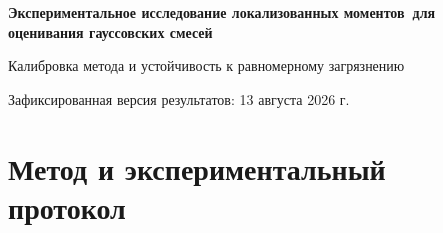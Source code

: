 \documentclass[11pt,a4paper]{article}
\begin{document}
\begin{center}
  {\sffamily\bfseries\LARGE
    Экспериментальное исследование локализованных моментов\
    для оценивания гауссовских смесей\par}
  \vspace{0.6em}
  {\large Калибровка метода и устойчивость к равномерному загрязнению\par}
  \vspace{0.4em}
  {\small Зафиксированная версия результатов: 13 августа 2026 г.}
\end{center}

\begin{abstract}
Мы исследуем оценивание сферических гауссовских смесей по локализованным
нулевым, первым и вторым моментам. Предварительные эксперименты показывают,
что на корректно специфицированных данных преимущество над EM ограничено
смесями с почти одинаковыми дисперсиями. Напротив, при замене
$2$--$10\%$ наблюдений равномерным фоновым шумом критерий только на вторых
моментах устойчиво превосходит EM по восстановлению незагрязнённой смеси и
кластеризации. В подтверждающем эксперименте с одинаковым набором тестовых
функций и новыми seed при $5\%$ загрязнения средний forward KL уменьшается с
$0.277$ до $0.145$, а ARI возрастает с $0.384$ до $0.534$. Контроли показывают,
что эффект не объясняется большим числом направлений, случайностью запуска
или размещением тестов в областях малой плотности. Добавление нулевых и первых
моментов при достаточно сильном загрязнении ухудшает результат; следовательно,
это не безусловно полезные дополнительные ограничения, а чувствительные к
misspecification компоненты критерия. Отдельно выводится leave-one-out
поправка, устраняющая смещение, возникающее, когда центрами тестов служат сами
наблюдения.
\end{abstract}

\section{Метод и экспериментальный протокол}
\end{document}
